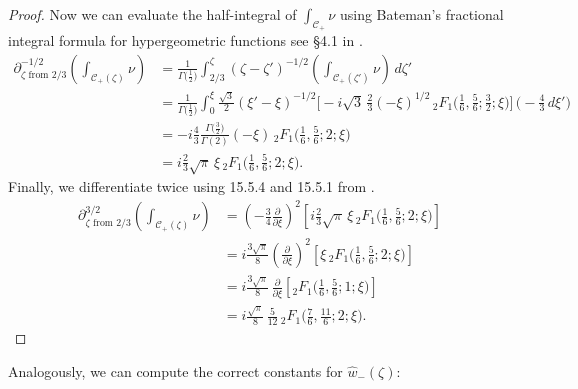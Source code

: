 \documentclass{article}
\theoremstyle{definition}
\begin{document}
\begin{proof}
Now we can evaluate the half-integral of $\int_{\mathcal{C}_+} \nu$ using Bateman's fractional integral formula for hypergeometric functions see \S 4.1 in \cite{koornwinder2015fractional}.
\begin{align*}
\partial^{-1/2}_{\zeta \text{ from } 2/3} \left( \int_{\mathcal{C}_+(\zeta)} \nu \right) & = \frac{1}{\Gamma\big(\tfrac{1}{2}\big)} \int_{2/3}^\zeta (\zeta - \zeta')^{-1/2} \left( \int_{\mathcal{C}_+(\zeta')} \nu \right)\,d\zeta' \\
& = \frac{1}{\Gamma\big(\tfrac{1}{2}\big)} \int_0^\xi \tfrac{\sqrt{3}}{2} (\xi' - \xi)^{-1/2} \Big[ -{i}{\sqrt{3}}\,\tfrac{2}{3} (-\xi)^{1/2}\,{}_2F_1\big(\tfrac{1}{6}, \tfrac{5}{6}; \tfrac{3}{2}; \xi\big) \Big] \,\big( -\tfrac{4}{3}\,d\xi' \big) \\
& = -i \frac{4}{3} \frac{\Gamma\big(\tfrac{3}{2}\big)}{\Gamma(2)} (-\xi)\,{}_2F_1\big(\tfrac{1}{6}, \tfrac{5}{6}; 2; \xi\big) \\
& = i \frac{2}{3} \sqrt{\pi}\,\xi\, {}_2F_1\big(\tfrac{1}{6}, \tfrac{5}{6}; 2; \xi\big).
\end{align*}
Finally, we differentiate twice using 15.5.4 and 15.5.1 from \cite{dlmf}.
\begin{align*}
\partial^{3/2}_{\zeta \text{ from } 2/3} \left( \int_{\mathcal{C}_+(\zeta)} \nu \right) & = \left(-\tfrac{3}{4} \tfrac{\partial}{\partial \xi}\right)^2 \left[ i \frac{2}{3} \sqrt{\pi}\,\xi\, {}_2F_1\big(\tfrac{1}{6}, \tfrac{5}{6}; 2; \xi\big) \right] \\
& = i \tfrac{3\sqrt{\pi}}{8} \left(\tfrac{\partial}{\partial \xi}\right)^2 \left[ \xi\,{}_2F_1\big(\tfrac{1}{6}, \tfrac{5}{6}; 2; \xi\big) \right] \\
& = i \tfrac{3\sqrt{\pi}}{8}\,\tfrac{\partial}{\partial \xi} \left[ {}_2F_1\big(\tfrac{1}{6}, \tfrac{5}{6}; 1; \xi\big) \right] \\
& = i \tfrac{\sqrt{\pi}}{8}\,\tfrac{5}{12}\, {}_2F_1\big(\tfrac{7}{6}, \tfrac{11}{6}; 2; \xi\big).
\end{align*}
\end{proof}
Analogously, we can compute the correct constants for $\hat{w}_-(\zeta)$:
\end{document}
